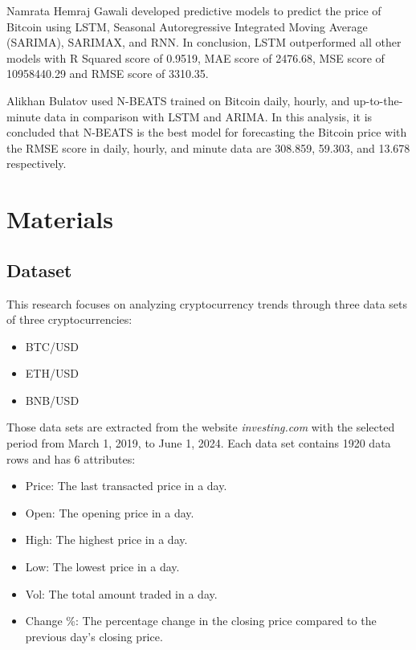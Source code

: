 \documentclass{ieeeojies}
\begin{document}
Namrata Hemraj Gawali \cite{b4} developed predictive models to predict the price of Bitcoin using LSTM, Seasonal Autoregressive Integrated Moving Average (SARIMA), SARIMAX, and RNN. In conclusion, LSTM outperformed all other models with R Squared score of 0.9519, MAE score of 2476.68, MSE score of 10958440.29 and RMSE score of 3310.35.

Alikhan Bulatov \cite{b5} used N-BEATS trained on Bitcoin daily, hourly, and up-to-the-minute data in comparison with LSTM and ARIMA. In this analysis, it is concluded that N-BEATS is the best model for forecasting the Bitcoin price with the RMSE score in daily, hourly, and minute data are 308.859, 59.303, and 13.678 respectively.

\section{Materials}
\subsection{Dataset}
This research focuses on analyzing cryptocurrency trends through three data sets of three cryptocurrencies:
\begin{itemize}
	\item BTC/USD
	\item ETH/USD
	\item BNB/USD
\end{itemize}
Those data sets are extracted from the website \textit{investing.com} with the selected period from March 1, 2019, to June 1, 2024. 
Each data set contains 1920 data rows and has 6 attributes:
\begin{itemize}
	\item Price: The last transacted price in a day.
	\item Open: The opening price in a day.
	\item High: The highest price in a day.
	\item Low: The lowest price in a day.
	\item Vol: The total amount traded in a day.
	\item Change \%: The percentage change in the closing price compared to the previous day’s closing price.
\end{itemize}
\end{document}
